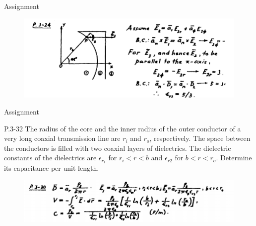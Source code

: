 \documentclass[xcolor={dvipsnames}]{beamer}
\begin{document}
\begin{frame}{Assignment}
\begin{figure}[H]
	\centering
	\includegraphics[width=0.98\linewidth]{3_7.png}
\end{figure}
\end{frame}
\begin{frame}{Assignment}
\begin{block}{P.3-32}
The radius of the core and the inner radius of the outer conductor of a very long coaxial transmission line are $r_i$ and $r_o$, respectively. The space between the conductors is filled with two coaxial layers of dielectrics. The dielectric constants of the dielectrics are $\epsilon_{r_1}$ for $r_i<r<b$ and $\epsilon_{r2}$ for $b<r<r_o$. Determine its capacitance per unit length.\\
\end{block}
\pause
\begin{figure}[H]
	\centering
	\includegraphics[width=0.95\linewidth]{3_8.png}
\end{figure}
\end{frame}
\end{document}
